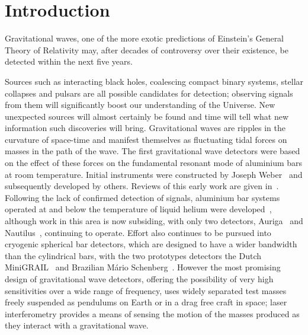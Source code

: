 \documentclass{article}
\begin{document}



\newpage

\section{Introduction}
\label{section:introduction}

Gravitational waves, one of the more exotic predictions of Einstein's General
Theory of Relativity may, after decades of controversy over their existence, be
detected within the next five years.

Sources such as interacting black holes, coalescing compact binary systems,
stellar collapses and pulsars are all possible candidates for detection;
observing signals from them will significantly boost our understanding of the
Universe. New unexpected sources will almost certainly be found and time will
tell what new information such discoveries will bring. Gravitational waves are
ripples in the curvature of space-time and manifest themselves as fluctuating
tidal forces on masses in the path of the wave. The first gravitational wave
detectors were based on the effect of these forces on the fundamental resonant
mode of aluminium bars at room temperature. Initial instruments were constructed
by Joseph Weber~\cite{Weber1, Weber2} and subsequently developed by others.
Reviews of this early work are given in~\cite{Tyson, Douglass}. Following the
lack of confirmed detection of signals, aluminium bar systems operated at and
below the temperature of liquid helium were developed~\cite{Astone, Prodi,
Amaldi, Heng}, although work in this area is now subsiding, with only two
detectors, Auriga~\cite{AURIGA} and Nautilus~\cite{NAUTILUS}, continuing to
operate. Effort also continues to be pursued into cryogenic spherical bar
detectors, which are designed to have a wider bandwidth than the cylindrical
bars, with the two prototypes detectors the Dutch MiniGRAIL~\cite{MiniGRAIL,
Gottardi:2007} and Brazilian M\'{a}rio Schenberg~\cite{Schenberg, Aguiar:2006}.
However the most promising design of gravitational wave detectors, offering the
possibility of very high sensitivities over a wide range of frequency, uses
widely separated test masses freely suspended as pendulums on Earth or in a drag
free craft in space; laser interferometry provides a means of sensing the motion
of the masses produced as they interact with a gravitational wave.
\end{document}
